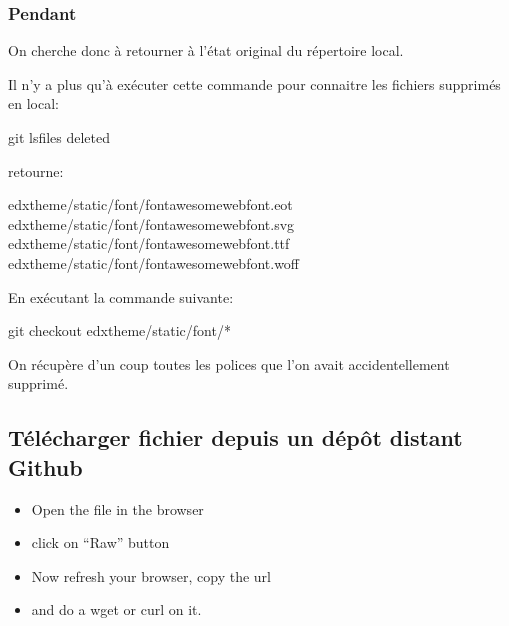 \documentclass[a4paper,10pt,french]{sphinxmanual}
\begin{document}
\subsubsection{Pendant}
\label{\detokenize{docs/tuts/autocad-tut01:pendant}}
On cherche donc à retourner à l'état original du répertoire local.

Il n'y a plus qu'à exécuter cette commande pour connaitre les fichiers supprimés en local:

\begin{sphinxVerbatim}[commandchars=\\\{\}]
\PYGZdl{} git ls\PYGZhy{}files \PYGZhy{}\PYGZhy{}deleted
\end{sphinxVerbatim}

retourne:

\begin{sphinxVerbatim}[commandchars=\\\{\},numbers=left,firstnumber=1,stepnumber=1]
edx\PYGZus{}theme/static/font/fontawesome\PYGZus{}webfont.eot
edx\PYGZus{}theme/static/font/fontawesome\PYGZus{}webfont.svg
edx\PYGZus{}theme/static/font/fontawesome\PYGZus{}webfont.ttf
edx\PYGZus{}theme/static/font/fontawesome\PYGZus{}webfont.woff
\end{sphinxVerbatim}

En exécutant la commande suivante:

\begin{sphinxVerbatim}[commandchars=\\\{\}]
\PYGZdl{} git checkout \PYGZhy{}\PYGZhy{} edx\PYGZus{}theme/static/font/*
\end{sphinxVerbatim}

On récupère d'un coup toutes les polices que l'on avait accidentellement supprimé.


\subsection{Télécharger  fichier depuis un dépôt distant Github}
\label{\detokenize{docs/tuts/autocad-tut01:telecharger-un-seul-fichier-depuis-un-depot-distant-github}}\begin{itemize}
\item {} 
Open the file in the browser

\item {} 
click on ``Raw'' button

\item {} 
Now refresh your browser, copy the url

\item {} 
and do a wget or curl on it.

\end{itemize}
\end{document}
